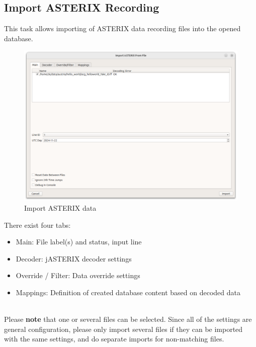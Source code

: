 \subsection{Import ASTERIX Recording}
\label{sec:ui_import_asterix}

This task allows importing of ASTERIX data recording files into the opened database. \\

\begin{figure}[H]
  \center
    \hspace*{-0.5cm}
    \includegraphics[width=17cm]{figures/asterix_import_data.png}
  \caption{Import ASTERIX data}
\end{figure}

There exist four tabs:

\begin{itemize}
\item Main: File label(s) and status, input line
\item Decoder: jASTERIX decoder settings
\item Override / Filter: Data override settings
\item Mappings: Definition of created database content based on decoded data
\end{itemize}
\ \\

Please \textbf{note} that one or several files can be selected. Since all of the settings are general configuration, please only import several files if they can be imported with the same settings, and do separate imports for non-matching files. \\

